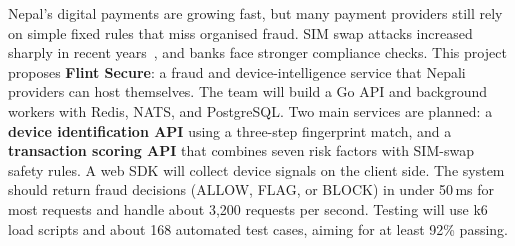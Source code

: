 \documentclass[proposal,minor]{ncitproject}
\begin{document}
\maketitlepage


\begin{ncitabstract}
Nepal's digital payments are growing fast, but many payment providers still rely on simple fixed rules that miss organised fraud. SIM swap attacks increased sharply in recent years~\cite{fiu2024}, and banks face stronger compliance checks. This project proposes \textbf{Flint Secure}: a fraud and device-intelligence service that Nepali providers can host themselves. The team will build a Go API and background workers with Redis, NATS, and PostgreSQL. Two main services are planned: a \textbf{device identification API} using a three-step fingerprint match, and a \textbf{transaction scoring API} that combines seven risk factors with SIM-swap safety rules. A web SDK will collect device signals on the client side. The system should return fraud decisions (ALLOW, FLAG, or BLOCK) in under 50\,ms for most requests and handle about 3,200 requests per second. Testing will use k6 load scripts and about 168 automated test cases, aiming for at least 92\% passing.
\end{ncitabstract}

\ncitprintfrontmatter


\end{document}
